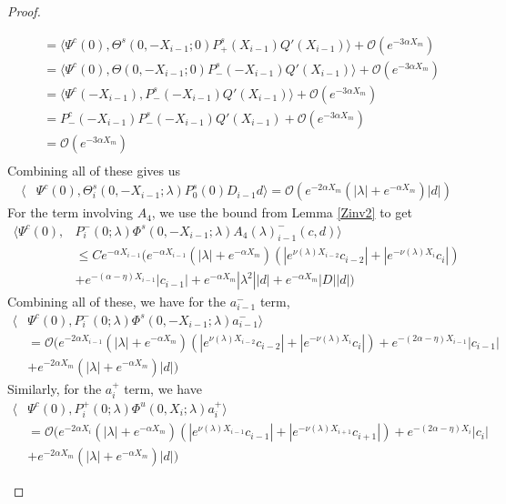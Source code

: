 \documentclass[thesis.tex]{subfiles}
\begin{document}
\begin{lemma}
\begin{proof}
\begin{enumerate}
\begin{align*}
&= \langle \Psi^c(0), \Theta^s(0, -X_{i-1}; 0) P^s_+(X_{i-1}) Q'(X_{i-1}) \rangle + \mathcal{O}(e^{-3 \alpha X_m}) \\
&= \langle \Psi^c(0), \Theta(0, -X_{i-1}; 0) P^s_-(-X_{i-1}) Q'(X_{i-1}) \rangle + \mathcal{O}(e^{-3 \alpha X_m}) \\
&= \langle \Psi^c(-X_{i-1}), P^s_-(-X_{i-1}) Q'(X_{i-1}) \rangle + \mathcal{O}(e^{-3 \alpha X_m}) \\
&= P^c_-(-X_{i-1}) P^s_-(-X_{i-1}) Q'(X_{i-1}) + \mathcal{O}(e^{-3 \alpha X_m}) \\
&= \mathcal{O}(e^{-3 \alpha X_m}) \\
\end{align*}
Combining all of these gives us
\begin{align*}
\langle &\Psi^c(0), \Theta_i^s(0, -X_{i-1}; \lambda) P_0^s(0) D_{i-1} d \rangle = \mathcal{O}( e^{-2 \alpha X_m} ( |\lambda| +  e^{-\alpha X_m} ) |d|)
\end{align*}
For the term involving $A_4$, we use the bound from Lemma \ref{Zinv2} to get
\begin{align*}
\langle \Psi^c(0), &P_i^-(0; \lambda) \Phi^s(0, -X_{i-1}; \lambda) A_4(\lambda)_{i-1}^-(c, d) \rangle \\
&\leq C e^{-\alpha X_{i-1}} \Big(  
e^{-\alpha X_{i-1}} (|\lambda| + e^{-\alpha X_m})(|e^{\nu(\lambda)X_{i-2}} c_{i-2}| + |e^{-\nu(\lambda)X_i}c_i|) \\
&+ e^{-(\alpha - \eta)X_{i-1}}|c_{i-1}| + e^{-\alpha X_m} |\lambda^2||d| + e^{-\alpha X_m}|D||d| \Big)
\end{align*}
Combining all of these, we have for the $a_{i-1}^-$ term,
\begin{align*}
\langle &\Psi^c(0), P_i^-(0; \lambda) \Phi^s(0, -X_{i-1}; \lambda) a_{i-1}^- \rangle \\
&= \mathcal{O}\Big(  
e^{-2 \alpha X_{i-1}} (|\lambda| + e^{-\alpha X_m})(|e^{\nu(\lambda)X_{i-2}} c_{i-2}| + |e^{-\nu(\lambda)X_i}c_i|) + e^{-(2 \alpha - \eta)X_{i-1}}|c_{i-1}| \\
&+ e^{-2 \alpha X_m} 
(|\lambda| + e^{-\alpha X_m}) |d| )
\end{align*}
Similarly, for the $a_i^+$ term, we have
\begin{align*}
\langle &\Psi^c(0), P_i^+(0; \lambda) \Phi^u(0, X_i; \lambda) a_i^+ \rangle \\
&= \mathcal{O}\Big(  
e^{-2 \alpha X_i} (|\lambda| + e^{-\alpha X_m})(|e^{\nu(\lambda)X_{i-1}} c_{i-1}| + |e^{-\nu(\lambda)X_{i+1}}c_{i+1}|) + e^{-(2 \alpha - \eta)X_i}|c_i| \\
&+ e^{-2 \alpha X_m} 
(|\lambda| + e^{-\alpha X_m}) |d| )
\end{align*}


\end{enumerate}
\end{proof}
\end{lemma}
\end{document}
